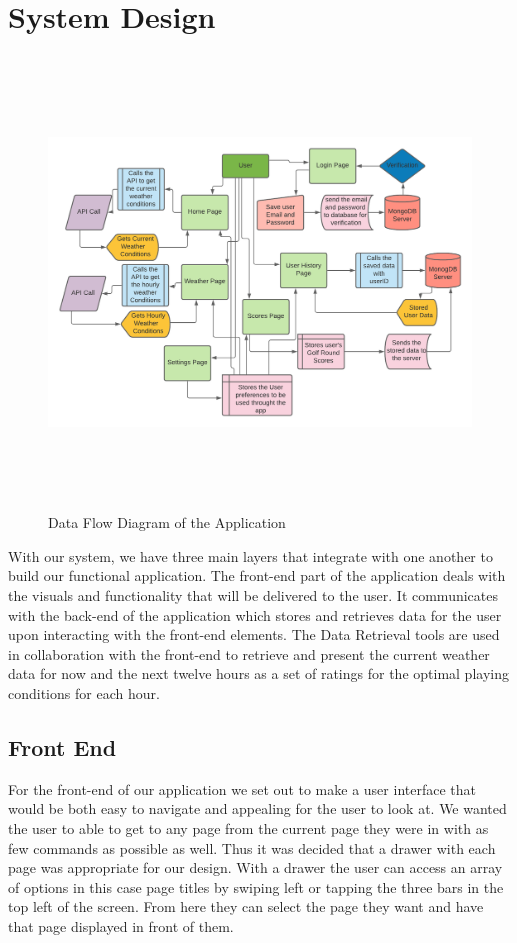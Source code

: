 \chapter{System Design}
\begin{figure}[H]
    \centering
    \includegraphics[width=14cm, height=12cm]{img/dfd.png}
    \caption{Data Flow Diagram of the Application}
    \label{fig:altas config}
\end{figure}
With our system, we have three main layers that integrate with one another to build our functional application. The front-end part of the application deals with the visuals and functionality that will be delivered to the user. It communicates with the back-end of the application which stores and retrieves data for the user upon interacting with the front-end elements. The Data Retrieval tools are used in collaboration with the front-end to retrieve and present the current weather data for now and the next twelve hours as a set of ratings for the optimal playing conditions for each hour.
\section{Front End}
For the front-end of our application we set out to make a user interface that would be both easy to navigate and appealing for the user to look at. We wanted the user to able to get to any page from the current page they were in with as few commands as possible as well. Thus it was decided that a drawer with each page was appropriate for our design. With a drawer the user can access an array of options in this case page titles by swiping left or tapping the three bars in the top left of the screen. From here they can select the page they want and have that page displayed in front of them.
